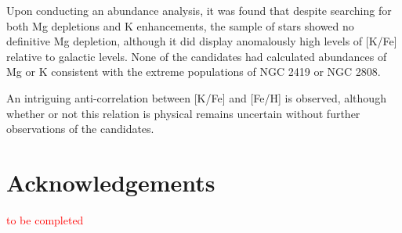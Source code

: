 \documentclass[a4paper,fleqn,usenatbib]{mnras}
\newcommand{\todo}[1]{\textcolor{red}{#1}}
\begin{document}
Upon conducting an abundance analysis, it was found that despite searching for both Mg depletions and K enhancements, the sample of stars showed no definitive Mg depletion, although it did display anomalously high levels of [K/Fe] relative to galactic levels. None of the candidates had calculated abundances of Mg or K consistent with the extreme populations of NGC 2419 or NGC 2808.

An intriguing anti-correlation between [K/Fe] and [Fe/H] is observed, although whether or not this relation is physical remains uncertain without further observations of the candidates.

\section*{Acknowledgements}
\todo{to be completed}

\bsp	%
\label{lastpage}
\end{document}
